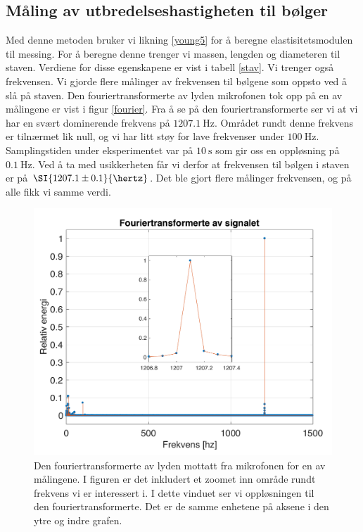 \documentclass[%
 reprint,
nofootinbib,
aps,
]{revtex4-1}
\begin{document}
\subsection{Måling av utbredelseshastigheten til bølger}
Med denne metoden bruker vi likning \eqref{young5} for å beregne elastisitetsmodulen til messing. For å beregne denne trenger vi massen, lengden og diameteren til staven. Verdiene for disse egenskapene er vist i tabell \vref{stav}. Vi trenger også frekvensen. Vi gjorde flere målinger av frekvensen til bølgene som oppsto ved å slå på staven. Den fouriertransformerte av lyden mikrofonen tok opp på en av målingene er vist i figur \vref{fourier}. Fra å se på den fouriertransformerte ser vi at vi har en svært dominerende frekvens på $\SI{1207.1}{\hertz}$. Området rundt denne frekvens er tilnærmet lik null, og vi har litt støy for lave frekvenser under $\SI{100}{\hertz}$. Samplingstiden under eksperimentet var på $\SI{10}{\second}$ som gir oss en oppløsning på $\SI{0.1}{\hertz}$. Ved å ta med usikkerheten får vi derfor at frekvensen til bølgen i staven er på $\SI{1207.1\pm0.1}{\hertz}$. Det ble gjort flere målinger frekvensen, og på alle fikk vi samme verdi.
\begin{figure}[h!]
  \centering
  \includegraphics[scale=0.47]{fourier_c.pdf}
  \caption{Den fouriertransformerte av lyden mottatt fra mikrofonen for en av målingene. I figuren er det inkludert et zoomet inn område rundt frekvens vi er interessert i. I dette vinduet ser vi oppløsningen til den fouriertransformerte. Det er de samme enhetene på aksene i den ytre og indre grafen.}
  \label{fourier}
\end{figure}
\end{document}
